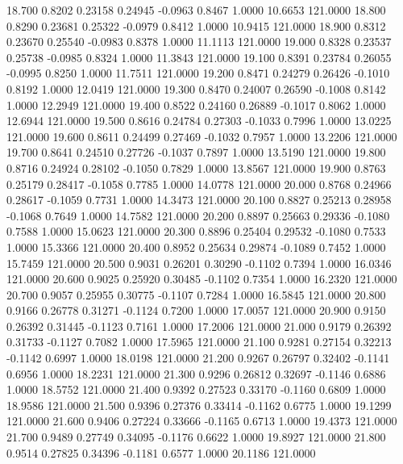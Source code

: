  18.700   0.8202   0.23158   0.24945  -0.0963   0.8467   1.0000  10.6653 121.0000
  18.800   0.8290   0.23681   0.25322  -0.0979   0.8412   1.0000  10.9415 121.0000
  18.900   0.8312   0.23670   0.25540  -0.0983   0.8378   1.0000  11.1113 121.0000
  19.000   0.8328   0.23537   0.25738  -0.0985   0.8324   1.0000  11.3843 121.0000
  19.100   0.8391   0.23784   0.26055  -0.0995   0.8250   1.0000  11.7511 121.0000
  19.200   0.8471   0.24279   0.26426  -0.1010   0.8192   1.0000  12.0419 121.0000
  19.300   0.8470   0.24007   0.26590  -0.1008   0.8142   1.0000  12.2949 121.0000
  19.400   0.8522   0.24160   0.26889  -0.1017   0.8062   1.0000  12.6944 121.0000
  19.500   0.8616   0.24784   0.27303  -0.1033   0.7996   1.0000  13.0225 121.0000
  19.600   0.8611   0.24499   0.27469  -0.1032   0.7957   1.0000  13.2206 121.0000
  19.700   0.8641   0.24510   0.27726  -0.1037   0.7897   1.0000  13.5190 121.0000
  19.800   0.8716   0.24924   0.28102  -0.1050   0.7829   1.0000  13.8567 121.0000
  19.900   0.8763   0.25179   0.28417  -0.1058   0.7785   1.0000  14.0778 121.0000
  20.000   0.8768   0.24966   0.28617  -0.1059   0.7731   1.0000  14.3473 121.0000
  20.100   0.8827   0.25213   0.28958  -0.1068   0.7649   1.0000  14.7582 121.0000
  20.200   0.8897   0.25663   0.29336  -0.1080   0.7588   1.0000  15.0623 121.0000
  20.300   0.8896   0.25404   0.29532  -0.1080   0.7533   1.0000  15.3366 121.0000
  20.400   0.8952   0.25634   0.29874  -0.1089   0.7452   1.0000  15.7459 121.0000
  20.500   0.9031   0.26201   0.30290  -0.1102   0.7394   1.0000  16.0346 121.0000
  20.600   0.9025   0.25920   0.30485  -0.1102   0.7354   1.0000  16.2320 121.0000
  20.700   0.9057   0.25955   0.30775  -0.1107   0.7284   1.0000  16.5845 121.0000
  20.800   0.9166   0.26778   0.31271  -0.1124   0.7200   1.0000  17.0057 121.0000
  20.900   0.9150   0.26392   0.31445  -0.1123   0.7161   1.0000  17.2006 121.0000
  21.000   0.9179   0.26392   0.31733  -0.1127   0.7082   1.0000  17.5965 121.0000
  21.100   0.9281   0.27154   0.32213  -0.1142   0.6997   1.0000  18.0198 121.0000
  21.200   0.9267   0.26797   0.32402  -0.1141   0.6956   1.0000  18.2231 121.0000
  21.300   0.9296   0.26812   0.32697  -0.1146   0.6886   1.0000  18.5752 121.0000
  21.400   0.9392   0.27523   0.33170  -0.1160   0.6809   1.0000  18.9586 121.0000
  21.500   0.9396   0.27376   0.33414  -0.1162   0.6775   1.0000  19.1299 121.0000
  21.600   0.9406   0.27224   0.33666  -0.1165   0.6713   1.0000  19.4373 121.0000
  21.700   0.9489   0.27749   0.34095  -0.1176   0.6622   1.0000  19.8927 121.0000
  21.800   0.9514   0.27825   0.34396  -0.1181   0.6577   1.0000  20.1186 121.0000

